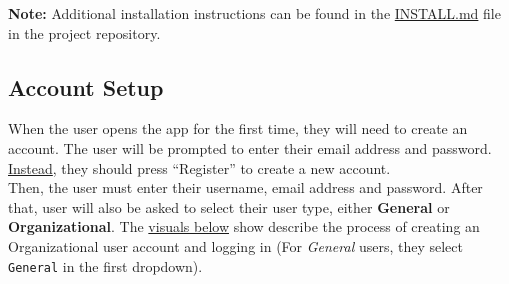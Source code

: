 \documentclass[12pt, titlepage]{article}
\begin{document}
\textbf{Note:} Additional installation instructions can be found in the \href{https://github.com/russellrd/realm/blob/main/INSTALL.md}{INSTALL.md} file in the project repository.

\subsection{Account Setup}
When the user opens the app for the first time, they will need to create an account. The user will be prompted to enter their email address and password. \hyperref[fig:setup1]{Instead}, they should press ``Register'' to create a new account. \\
Then, the user must enter their username, email address and password. After that, user will also be asked to select their user type, either \textbf{General} or \textbf{Organizational}. The \hyperref[fig:setup1]{visuals below} show describe the process of creating an Organizational user account and logging in (For \emph{General} users, they select \texttt{General} in the first dropdown).
\end{document}
